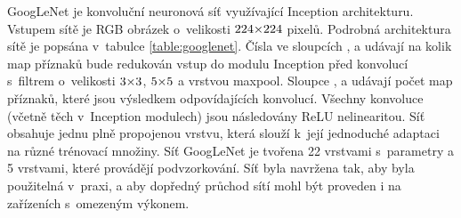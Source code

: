 GoogLeNet je konvoluční neuronová síť využívající Inception architekturu.
Vstupem sítě je RGB obrázek o~velikosti $\sisetup{tight-spacing=true}224{\times}224$ pixelů.
Podrobná architektura sítě je popsána v~tabulce \ref{table:googlenet}.
Čísla ve sloupcích ,  a  udávají na kolik map příznaků bude redukován vstup do modulu Inception před konvolucí s~filtrem o~velikosti $\sisetup{tight-spacing=true}3{\times}3$, $\sisetup{tight-spacing=true}5{\times}5$ a vrstvou maxpool.
Sloupce ,  a  udávají počet map příznaků, které jsou výsledkem odpovídajících konvolucí.
Všechny konvoluce (včetně těch v~Inception modulech) jsou následovány ReLU nelinearitou.
Síť obsahuje jednu plně propojenou vrstvu, která slouží k~její jednoduché adaptaci na různé trénovací množiny.
Síť GoogLeNet je tvořena 22 vrstvami s~parametry a 5 vrstvami, které provádějí podvzorkování.
Síť byla navržena tak, aby byla použitelná v~praxi, a aby dopředný průchod sítí mohl být proveden i na zařízeních s~omezeným výkonem.

